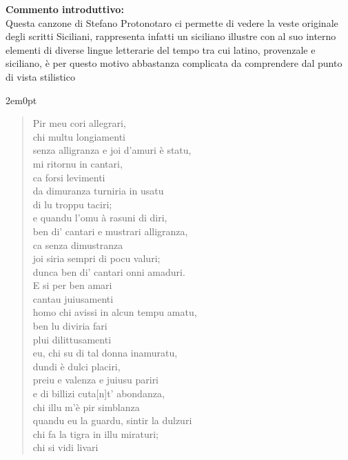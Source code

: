 \newpage
\hypertarget{para:pirmeu}{}


\textbf{Commento introduttivo:}\\
Questa canzone di Stefano Protonotaro ci permette di vedere la veste originale degli scritti Siciliani, rappresenta infatti un siciliano illustre con al suo interno elementi di diverse lingue letterarie del tempo tra cui latino, provenzale e siciliano, è per questo motivo abbastanza complicata da comprendere dal punto di vista stilistico

\vspace{1.5em}

\begin{adjustwidth}{2em}{0pt}
\verselinenumbersleft
\begin{verse}
Pir meu cori allegrari, \\
chi multu longiamenti\\
senza alligranza e joi d'amuri è statu,\\
mi ritornu in cantari,\\
ca forsi levimenti\\
da dimuranza turniria in usatu\\
di lu troppu taciri;\\
e quandu l'omu à rasuni di diri,\\
ben di' cantari e mustrari alligranza,\\
ca senza dimustranza\\
joi siria sempri di pocu valuri;\\
dunca ben di' cantari onni amaduri.\\
E si per ben amari\\
cantau juiusamenti\\
homo chi avissi in alcun tempu amatu,\\
ben lu diviria fari\\
plui dilittusamenti\\
eu, chi su di tal donna inamuratu,\\
dundi è dulci placiri,\\
preiu e valenza e juiusu pariri\\
e di billizi cuta[n]t' abondanza,\\
chi illu m'è pir simblanza\\
quandu eu la guardu, sintir la dulzuri\\
chi fa la tigra in illu miraturi;\\
chi si vidi livari\\

\end{verse}
\end{adjustwidth}
